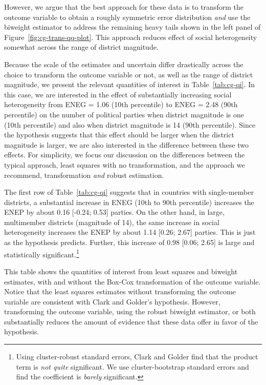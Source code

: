 \documentclass[12pt]{article}
\begin{document}
However, we argue that the best approach for these data is to transform the outcome variable to obtain a roughly symmetric error distribution \textit{and} use the biweight estimator to address the remaining heavy tails shown in the left panel of Figure~\ref{fig:cg-trans-qq-plot}. 
This approach reduces effect of social heterogeneity somewhat across the range of district magnitude.

Because the scale of the estimates and uncertain differ drastically across the choice to transform the outcome variable or not, as well as the range of district magnitude, we present the relevant quantities of interest in Table~\ref{tab:cg-qi}. 
In this case, we are interested in the effect of substantially increasing social heterogeneity from ENEG = 1.06 (10th percentile) to ENEG = 2.48 (90th percentile) on the number of political parties when district magnitude is one (10th percentile) and also when district magnitude is 14 (90th percentile). 
Since the hypothesis suggests that this effect should be larger when the district magnitude is larger, we are also interested in the difference between these two effects. 
For simplicity, we focus our discussion on the differences between the typical approach, least squares with no transformation, and the approach we recommend, transformation \textit{and} robust estimation.

The first row of Table~\ref{tab:cg-qi} suggests that in countries with single-member districts, a substantial increase in ENEG (10th to 90th percentile) increases the ENEP by about 0.16 [-0.24; 0.53] parties. 
On the other hand, in large, multimember districts (magnitude of 14), the same increase in social heterogeneity increases the ENEP by about 1.14 [0.26; 2.67] parties. 
This is just as the hypothesis predicts. 
Further, this increase of 0.98 [0.06; 2.65] is large and statistically significant.\footnote{Using cluster-robust standard errors, Clark and Golder find that the product term is \textit{not quite} significant. We use cluster-bootstrap standard errors and find the coefficient is \textit{barely} significant.}

\begin{table}[h!]
{\scriptsize

}
\caption{This table shows the quantities of interest from least squares and biweight estimates, with and without the Box-Cox transformation of the outcome variable. 
Notice that the least squares estimates without transforming the outcome variable are consistent with Clark and Golder's hypothesis. 
However, transforming the outcome variable, using the robust biweight estimator,  or both substantially reduces the amount of evidence that these data offer in favor of the hypothesis.}\label{tab:cg-qi}
\end{table}
\end{document}

